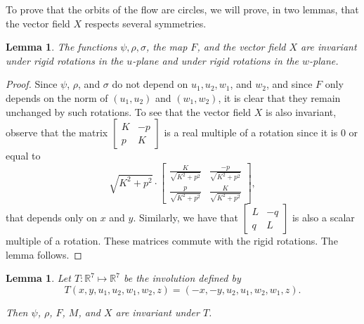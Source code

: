 \documentclass[11pt,reqno]{amsart}
\theoremstyle{plain}
\newtheorem{lemma}[theorem]{Lemma}
\theoremstyle{definition}
\theoremstyle{remark}
\theoremstyle{plain}
\numberwithin{equation}{section}
\newcommand{\R}{\mathbb{R}}
\newcommand{\p}{\partial}
\begin{document}
							To prove that the orbits of the flow are circles, we will prove, in two lemmas, that the vector field $X$ respects several symmetries.
							
							\begin{lemma} \label{lemma: invariancia por rotacao em u e em w}
								The functions \(\psi,\rho,\sigma\), the map \(F\), and the vector field \(X\) are invariant under rigid rotations in the \(u\)-plane and under rigid rotations in the \(w\)-plane.
					    	\end{lemma}
							\begin{proof}
								Since $\psi$, $\rho$, and $\sigma$ do not depend on $u_{1},u_{2},w_{1}$, and $w_{2}$, and since $F$ only depends on the norm of $(u_{1},u_{2})$ and $(w_{1},w_{2})$, it is clear that they remain unchanged by such rotations. To see that the vector field $X$ is also invariant, observe that the matrix $\begin{bmatrix}
									K&-p\\p&K
								\end{bmatrix}$ is a real multiple of a rotation since it is 0 or equal to $$\sqrt{K^{2}+p^{2}}\cdot \begin{bmatrix}
									\frac{K}{\sqrt{K^{2}+p^{2}}}&\frac{-p}{\sqrt{K^{2}+p^{2}}}\\\frac{p}{\sqrt{K^{2}+p^{2}}}&\frac{K}{\sqrt{K^{2}+p^{2}}}
								\end{bmatrix},$$ that depends only on $x$ and $y$. Similarly, we have that $\begin{bmatrix}
									L&-q\\q&L
								\end{bmatrix}$ is also a scalar multiple of a rotation. These matrices commute with the rigid rotations. The lemma follows.
							\end{proof}
							\begin{lemma} \label{lemma: invariancia pela involucao T pra psi}
								Let $T:\R^{7}\mapsto \R^{7}$ be the involution defined by $$T(x,y,u_{1},u_{2},w_{1},w_{2},z)=(-x,-y,u_{2},u_{1},w_{2},w_{1},z).$$
								
								Then $\psi$, $\rho$, $F$, $M$, and $X$ are invariant under $T$.
							\end{lemma}
\end{document}
